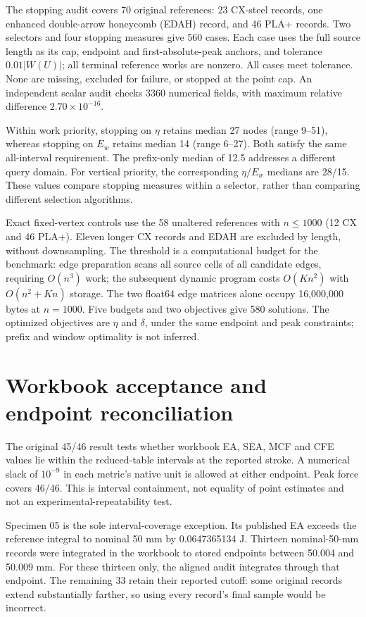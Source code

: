 \documentclass[11pt,a4paper]{article}
\begin{document}
The stopping audit covers 70 original references: 23 CX-steel records, one enhanced double-arrow honeycomb (EDAH) record, and 46 PLA+ records. Two selectors and four stopping measures give 560 cases. Each case uses the full source length as its cap, endpoint and first-absolute-peak anchors, and tolerance $0.01|W(U)|$; all terminal reference works are nonzero. All cases meet tolerance. None are missing, excluded for failure, or stopped at the point cap. An independent scalar audit checks 3360 numerical fields, with maximum relative difference $2.70\times10^{-16}$.

Within work priority, stopping on $\eta$ retains median 27 nodes (range 9--51), whereas stopping on $E_w$ retains median 14 (range 6--27). Both satisfy the same all-interval requirement. The prefix-only median of 12.5 addresses a different query domain. For vertical priority, the corresponding $\eta/E_w$ medians are 28/15. These values compare stopping measures within a selector, rather than comparing different selection algorithms.

Exact fixed-vertex controls use the 58 unaltered references with $n\leq1000$ (12 CX and 46 PLA+). Eleven longer CX records and EDAH are excluded by length, without downsampling. The threshold is a computational budget for the benchmark: edge preparation scans all source cells of all candidate edges, requiring $O(n^3)$ work; the subsequent dynamic program costs $O(Kn^2)$ with $O(n^2+Kn)$ storage. The two float64 edge matrices alone occupy 16,000,000 bytes at $n=1000$. Five budgets and two objectives give 580 solutions. The optimized objectives are $\eta$ and $\delta$, under the same endpoint and peak constraints; prefix and window optimality is not inferred.

\section{Workbook acceptance and endpoint reconciliation}
The original 45/46 result tests whether workbook EA, SEA, MCF and CFE values lie within the reduced-table intervals at the reported stroke. A numerical slack of $10^{-9}$ in each metric's native unit is allowed at either endpoint. Peak force covers 46/46. This is interval containment, not equality of point estimates and not an experimental-repeatability test.

Specimen 05 is the sole interval-coverage exception. Its published EA exceeds the reference integral to nominal 50 mm by 0.0647365134 J. Thirteen nominal-50-mm records were integrated in the workbook to stored endpoints between 50.004 and 50.009 mm. For these thirteen only, the aligned audit integrates through that endpoint. The remaining 33 retain their reported cutoff: some original records extend substantially farther, so using every record's final sample would be incorrect.
\end{document}
